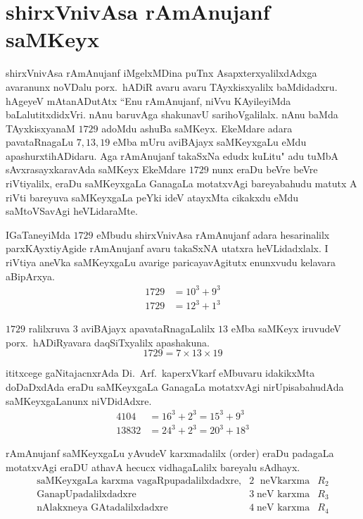 \chapter{shirxVnivAsa rAmAnujanf saMKeyx}

shirxVnivAsa rAmAnujanf iMgelxMDina puTnx AsapxterxyalilxdAdxga avaranunx noVDalu  porx.~hADiR avaru avaru TAyxkisxyalilx baMdidadxru. hAgeyeV mAtanADutAtx ``Enu rAmAnujanf, niVvu KAyileyiMda baLalutitxdidxVri. nAnu baruvAga shaku\-navU sarihoVgalilalx. nAnu baMda TAyxkisxyanaM $1729$ adoMdu ashuBa saMKeyx. EkeMdare adara pavataRnagaLu $7,13,19$ eMba mUru aviBAjayx saMKeyxgaLu eMdu apa\-shurxtihADidaru. Aga rAmAnujanf takaSxNa edudx kuLitu" adu tuMbA sAvxrasayxkaravAda saMKeyx EkeMdare $1729$ nunx eraDu beVre beVre riVtiyalilx, eraDu saMKeyxgaLa GanagaLa motatxvAgi bareyabahudu matutx A riVti bareyuva saMKeyxgaLa peYki ideV atayxMta cikakxdu eMdu saMtoVSavAgi heVLidaraMte.

IGaTaneyiMda $1729$ eMbudu shirxVnivAsa rAmAnujanf adara hesarinalilx parxKAyxtiyAgide rAmAnujanf avaru takaSxNA utatxra heVLidadxlalx. I riVtiya aneVka saMKeyxgaLu avarige paricayavAgitutx enunxvudu kelavara aBipArxya.
\begin{align*}
1729 &= 10^3+9^3\\
1729 &= 12^3+1^3 
\end{align*}

$1729$ ralilxruva $3$ aviBAjayx apavataRnagaLalilx $13$ eMba saMKeyx iruvudeV porx.~hADiRyavara daqSiTxyalilx apashakuna.
$$
1729 = 7\times 13 \times 19
$$

ititxcege gaNitajacnxrAda Di.~Arf.\ kaperxVkarf eMbuvaru idakikxMta doDaDxdAda eraDu saMKeyxgaLa GanagaLa motatxvAgi nirUpisabahudAda saMKeyxgaLanunx niVDidAdxre.
\begin{align*}
4104 &= 16^3 + 2^3 = 15^3 +9^3\\
13832 &= 24^3 +2^3 = 20^3 +18^3
\end{align*}

rAmAnujanf saMKeyxgaLu yAvudeV karxmadalilx {\rm(order)} eraDu padagaLa motatx\-vAgi eraDU athavA hecucx vidhagaLalilx bareyalu sAdhayx.
$$
\begin{array}{rll}
\text{saMKeyxgaLa karxma vagaRpupadalilxdadxre,} & 2\; \text{ neVkarxma} & R_2\\
\text{GanapUpadalilxdadxre}                      & 3\; \text{neV karxma} & R_3\\
\text{nAlakxneya GAtadalilxdadxre}               & 4\; \text{neV karxma} & R_4
\end{array}
$$

